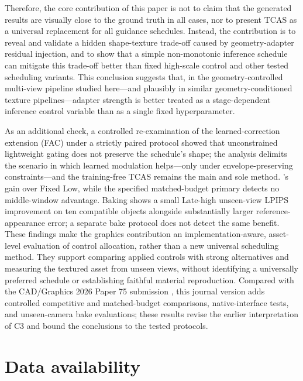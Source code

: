 \documentclass[times,twocolumn,final]{elsarticle}
\providecommand{\DIFadd}[1]{{\protect\color{blue} \sf #1}} %
\providecommand{\DIFdel}[1]{{\protect\color{red} \scriptsize #1}} %
\providecommand{\DIFaddbegin}{} %
\providecommand{\DIFaddend}{} %
\providecommand{\DIFdelend}{} %
\begin{document}
\DIFdel{Therefore, the core contribution of this paper is not to claim that the generated results are visually close to the ground truth in all cases, nor to present TCAS as a universal replacement for all guidance schedules. Instead, the contribution is to reveal and validate a hidden shape-texture trade-off caused by geometry-adapter residual injection, and to show that a simple non-monotonic inference schedule can mitigate this trade-off better than fixed high-scale control and other tested scheduling variants.
This conclusion suggests that, in the geometry-controlled multi-view pipeline studied here---and plausibly in similar geometry-conditioned texture pipelines---adapter strength is better treated as a stage-dependent inference control variable than as a single fixed hyperparameter. }%

\DIFdel{As an additional check, a controlled re-examination of the learned-correction extension (FAC) under a strictly paired protocol showed that unconstrained lightweight gating does not preserve the schedule's shape; the analysis delimits the scenario in which learned modulation helps---only under envelope-preserving constraints---and the training-free TCAS remains the main and sole method. }\DIFdelend \DIFaddbegin \DIFadd{'s gain over Fixed Low, while the specified matched-budget primary detects no middle-window advantage. Baking shows a small Late-high unseen-view LPIPS improvement on ten compatible objects alongside substantially larger reference-appearance error; a separate bake protocol does not detect the same benefit. These findings make the graphics contribution an implementation-aware, asset-level evaluation of control allocation, rather than a new universal scheduling method. They support comparing applied controls with strong alternatives and measuring the textured asset from unseen views, without identifying a universally preferred schedule or establishing faithful material reproduction. Compared with the CAD/Graphics 2026 Paper 75 submission \cite{che2026cadgraphics}, this journal version adds controlled competitive and matched-budget comparisons, native-interface tests, and unseen-camera bake evaluations; these results revise the earlier interpretation of C3 and bound the conclusions to the tested protocols.
}\DIFaddend

\section*{Data availability}
\end{document}
